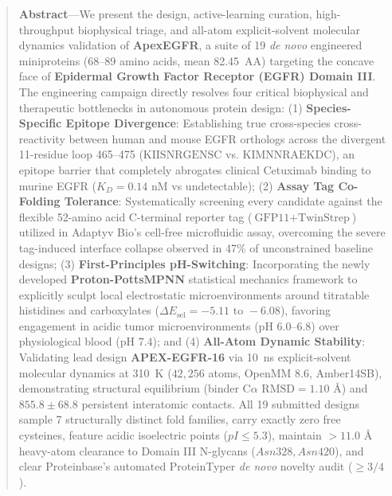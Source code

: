 \documentclass[11pt]{article}
\begin{document}
\vspace{0.8em}
\begin{quote}
  \noindent\textbf{\color{navyblue}Abstract}---We present the design, active-learning curation, high-throughput biophysical triage, and all-atom explicit-solvent molecular dynamics validation of \textbf{ApexEGFR}, a suite of 19 \textit{de novo} engineered miniproteins (68--89 amino acids, mean 82.45~AA) targeting the concave face of \textbf{Epidermal Growth Factor Receptor (EGFR) Domain III}. The engineering campaign directly resolves four critical biophysical and therapeutic bottlenecks in autonomous protein design:
  (1) \textbf{Species-Specific Epitope Divergence}: Establishing true cross-species cross-reactivity between human and mouse EGFR orthologs across the divergent 11-residue loop 465--475 ($\text{KIISNRGENSC}$ vs. $\text{KIMNNRAEKDC}$), an epitope barrier that completely abrogates clinical Cetuximab binding to murine EGFR ($K_D = 0.14\text{ nM}$ vs undetectable);
  (2) \textbf{Assay Tag Co-Folding Tolerance}: Systematically screening every candidate against the flexible 52-amino acid C-terminal reporter tag ($\text{GFP11} + \text{TwinStrep}$) utilized in Adaptyv Bio's cell-free microfluidic assay, overcoming the severe tag-induced interface collapse observed in 47\% of unconstrained baseline designs;
  (3) \textbf{First-Principles pH-Switching}: Incorporating the newly developed \textbf{Proton-PottsMPNN} statistical mechanics framework to explicitly sculpt local electrostatic microenvironments around titratable histidines and carboxylates ($\Delta E_{\text{sel}} = -5.11\text{ to } -6.08$), favoring engagement in acidic tumor microenvironments ($\text{pH } 6.0\text{--}6.8$) over physiological blood ($\text{pH } 7.4$); and
  (4) \textbf{All-Atom Dynamic Stability}: Validating lead design \textbf{APEX-EGFR-16} via 10~ns explicit-solvent molecular dynamics at 310~K ($42,256$ atoms, OpenMM 8.6, Amber14SB), demonstrating structural equilibrium (binder $\text{C}\alpha\text{ RMSD} = 1.10\text{ \AA}$) and $855.8 \pm 68.8$ persistent interatomic contacts.
  All 19 submitted designs sample 7 structurally distinct fold families, carry exactly zero free cysteines, feature acidic isoelectric points ($pI \le 5.3$), maintain $>11.0\text{ \AA}$ heavy-atom clearance to Domain III N-glycans ($Asn328, Asn420$), and clear Proteinbase's automated ProteinTyper \textit{de novo} novelty audit ($\ge 3/4$).
\end{quote}

\vspace{1.0em}
\tableofcontents
\newpage
\end{document}
